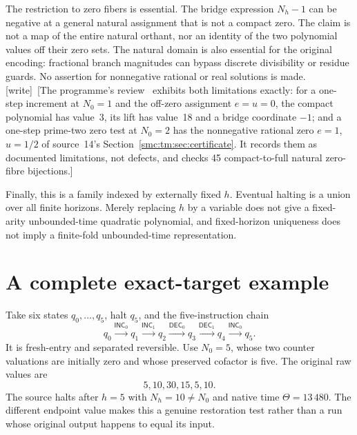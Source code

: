 \documentclass[11pt,letterpaper]{article}
\numberwithin{equation}{section}
\theoremstyle{definition}
\theoremstyle{remark}
\newcommand{\wtag}{\textup{[write]}}
\newcommand{\INC}{\mathsf{INC}}\newcommand{\DEC}{\mathsf{DEC}}\newcommand{\NOP}{\mathsf{NOP}}\newcommand{\ZERO}{\mathsf{ZERO}}\newcommand{\POS}{\mathsf{POS}}
\begin{document}
The restriction to zero fibers is essential. The bridge expression $N_h-1$ can be negative at a general natural assignment that is not a compact zero. The claim is not a map of the entire natural orthant, nor an identity of the two polynomial values off their zero sets. The natural domain is also essential for the original encoding: fractional branch magnitudes can bypass discrete divisibility or residue guards. No assertion for nonnegative rational or real solutions is made. \wtag\ [The programme's review~\cite{reviewthreemass} exhibits both limitations exactly: for a one-step increment at $N_0=1$ and the off-zero assignment $e=u=0$, the compact polynomial has value~3, its lift has value~18 and a bridge coordinate $-1$; and a one-step prime-two zero test at $N_0=2$ has the nonnegative rational zero $e=1$, $u=1/2$ of source~14's Section~\ref{smc:tm:sec:certificate}. It records them as documented limitations, not defects, and checks 45 compact-to-full natural zero-fibre bijections.]

Finally, this is a family indexed by externally fixed $h$. Eventual halting is a union over all finite horizons. Merely replacing $h$ by a variable does not give a fixed-arity unbounded-time quadratic polynomial, and fixed-horizon uniqueness does not imply a finite-fold unbounded-time representation.

\section{A complete exact-target example}\label{smc:ct:sec:example}

Take six states $q_0,\ldots,q_5$, halt $q_5$, and the five-instruction chain
\[
q_0\xrightarrow{\INC_0}q_1\xrightarrow{\INC_1}q_2
\xrightarrow{\DEC_0}q_3\xrightarrow{\DEC_1}q_4
\xrightarrow{\INC_0}q_5.
\]
It is fresh-entry and separated reversible. Use $N_0=5$, whose two counter valuations are initially zero and whose preserved cofactor is five. The original raw values are
\[
5,10,30,15,5,10.
\]
The source halts after $h=5$ with $N_h=10\ne N_0$ and native time $\Theta=13\,480$. The different endpoint value makes this a genuine restoration test rather than a run whose original output happens to equal its input.
\end{document}
